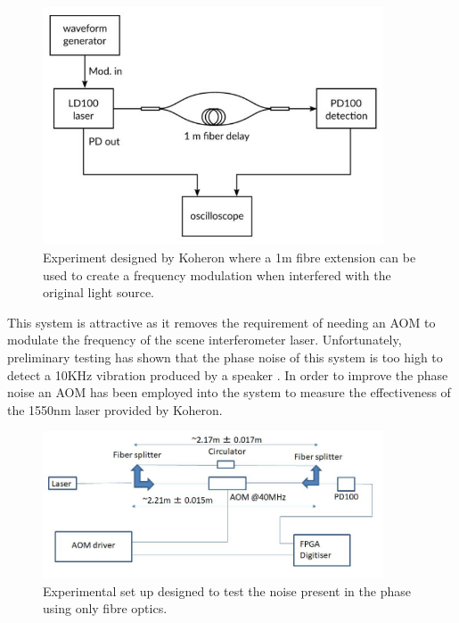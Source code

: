 \documentclass[12pt,a4paper,oneside]{report}
\begin{document}
\begin{figure}[H]
\includegraphics[width=0.9\textwidth, center,angle=0]{DImages/koheronfmod.JPG}
\caption{Experiment designed by Koheron where a 1m fibre extension can be used to create a frequency modulation when interfered with the original light source.}
\label{koheronfmod}
\end{figure}

This system is attractive as it removes the requirement of needing an AOM to modulate the frequency of the scene interferometer laser. Unfortunately, preliminary testing has shown that the phase noise of this system is too high to detect a 10KHz vibration produced by a speaker \cite{Hickling2017InvestigationMAST-U}. In order to improve the phase noise an AOM has been employed into the system to measure the effectiveness of the 1550nm laser provided by Koheron. 

\begin{figure}[H] 
\includegraphics[width=0.9\textwidth, center,angle=0]{DImages/intconfig1.JPG}
\caption{Experimental set up designed to test the noise present in the phase using only fibre optics.}
\label{intconfig1}
\end{figure}
\end{document}
